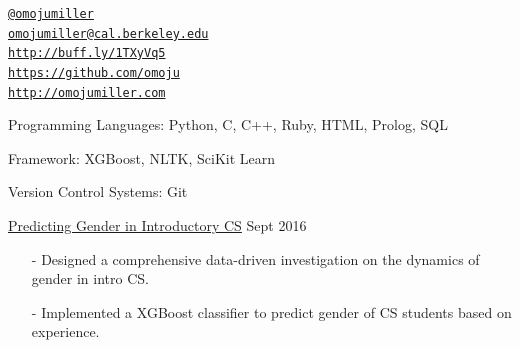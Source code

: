 \documentclass[10pt,article,oneside]{memoir}
\makeatletter
\def\myemail{omojumiller@cal.berkeley.edu}
\def\myweb{http://omojumiller.com}
\def\mytwitter{@omojumiller}
\def\mylinkedin{http://buff.ly/1TXyVq5}
\def\mygithub{https://github.com/omoju}
\makeatother
\begin{document}
\begin{minipage}[t]{2.95in}
  
\end{minipage}
\hfill     
\hfill
\begin{minipage}[t]{1.6in}
  \flushright \footnotesize  \addressblock 
  {\scriptsize  \texttt{\href{http://twitter.com/omojumiller}{\mytwitter}} \, \faTwitter }  \\ 
  {\scriptsize  \texttt{\href{mailto:\myemail}{\myemail}} \, \faEnvelope} \\
  {\scriptsize  \texttt{\href{\mylinkedin}{\mylinkedin}} \, \faLinkedin} \\
  {\scriptsize  \texttt{\href{\mygithub}{\mygithub}} \, \faGithub} \\
  {\scriptsize  \texttt{\href{\myweb}{\myweb}} \, \faGlobe}
\end{minipage}

\medskip


\bigskip       
{}
\reversemarginpar

\medskip

\ind Programming Languages: Python, C, C++, Ruby, HTML, Prolog, SQL

\ind Framework: XGBoost, NLTK, SciKit Learn

\ind Version Control Systems: Git
\bigskip 

\medskip

\ind \href{https://github.com/omoju/genderCSExperience}{Predicting Gender in Introductory CS} \hfill Sept 2016 
\begin{itemize}[noitemsep,nolistsep]
\item[-] Designed a comprehensive data-driven investigation on the dynamics of gender in intro CS. 
\item[-] Implemented a XGBoost classifier to predict gender of CS students based on experience.
\end{itemize}
\end{document}
